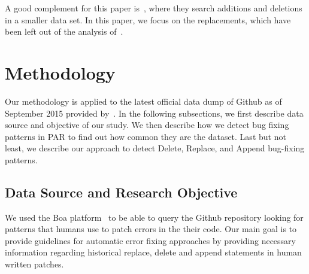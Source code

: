 \documentclass{sig-alternate-05-2015}
\begin{document}
A good complement for this paper is~\cite{zhong2015}, where they search additions and
deletions in a smaller data set. In this paper, we focus on the replacements,
which have been left out of the analysis of~\cite{zhong2015}.

\section{Methodology}
Our methodology is applied to the latest official data dump of Github as of
September 2015 provided by~\cite{dyer2013}. In the following subsections, we first
describe data source and objective of our study. We then describe how we detect
bug fixing patterns in PAR to find out how common they are the dataset. Last but
not least, we describe our approach to detect Delete, Replace, and Append
bug-fixing patterns.

\subsection{Data Source and Research Objective}
We used the Boa platform~\cite{dyer2013} to be able to query the Github repository
looking for patterns that humans use to patch errors in the their code. Our main
goal is to provide guidelines for automatic error fixing approaches by providing
necessary information regarding historical replace, delete and append statements
in human written patches. 
\end{document}
